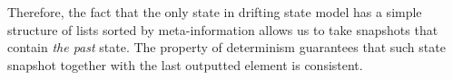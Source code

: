 Therefore, the fact that the only state in drifting state model has a simple structure of lists sorted by meta-information allows us to take snapshots that contain {\em the past} state. The property of determinism guarantees that such state snapshot together with the last outputted element is consistent. 










